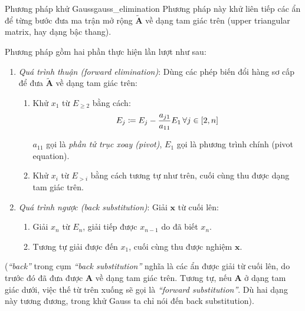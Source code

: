 \documentclass[../../Lectures]{subfiles}
\begin{document}
\begin{cmethod}{Phương pháp khử Gauss}{gauss_elimination}
    Phương pháp này khử liên tiếp các ẩn để từng bước đưa ma trận mở rộng
    \(\bm{\tilde{A}}\) về dạng tam giác trên (upper triangular matrix, hay dạng
    bậc thang).

    Phương pháp gồm hai phần thực hiện lần lượt như sau:

    \begin{enumerate}
        \item \emph{Quá trình thuận (forward elimination)}: Dùng các phép biến
            đổi hàng sơ cấp để đưa \(\bm{\tilde{A}}\) về dạng tam giác trên:
            \begin{enumerate}
                \item Khử \(x_1\) từ \(E_{\geq 2}\) bằng cách:
                    \begin{equation}\label{eq:gauss_elinimation_1st}
                        E_j \coloneqq E_j - \frac{a_{j1}}{a_{11}} E_1 \, \forall j \in \interval{2}{n}
                    \end{equation}

                    \(a_{11}\) gọi là \emph{phần tử trục xoay (pivot)}, \(E_1\)
                    gọi là phương trình chính (pivot equation).

                \item Khử \(x_i\) từ \(E_{> i}\) bằng cách tương tự như trên,
                    cuối cùng thu được dạng tam giác trên.
            \end{enumerate}

        \item \emph{Quá trình ngược (back substitution)}: Giải \(\bm{x}\) từ
            cuối lên:
            \begin{enumerate}
                \item Giải \(x_n\) từ \(E_n\), giải tiếp được \(x_{n - 1}\) do
                    đã biết \(x_n\).

                \item Tương tự giải được đến \(x_1\), cuối cùng thu được nghiệm
                    \(\bm{x}\).
            \end{enumerate}
    \end{enumerate}
\end{cmethod}

(\emph{``back''} trong cụm \emph{``back substitution''} nghĩa là các ẩn được
giải từ cuối lên, do trước đó đã đưa được \(\bm{A}\) về dạng tam giác trên.
Tương tự, nếu \(\bm{A}\) ở dạng tam giác dưới, việc thế từ trên xuống sẽ gọi là
\emph{``forward substitution''}. Dù hai dạng này tương đương, trong khử Gauss ta
chỉ nói đến back substitution).
\end{document}
